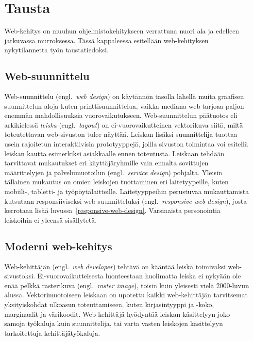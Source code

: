 \documentclass[finnish, 12pt, a4paper, elec, utf8, a-1b, online]{aaltothesis}
\begin{document}
\clearpage

\section{Tausta}

Web-kehitys on muuhun ohjelmistokehitykseen verrattuna nuori ala ja
edelleen jatkuvassa murroksessa. Tässä kappaleessa esitellään web-kehityksen
nykytilannetta työn taustatiedoksi.

\subsection{Web-suunnittelu}

Web-suunnittelu (engl.~\textit{web design}) on käytännön tasolla lähellä muita
graafisen suunnittelun aloja kuten printtisuunnittelua, vaikka mediana web
tarjoaa paljon enemmän mahdollisuuksia vuorovaikutukseen. Web-suunnittelun
päätuotos eli arkikielessä \textit{leiska} (engl.~\textit{layout}) on
ei-vuorovaikutteinen vektorikuva siitä, miltä toteutettavan web-sivuston tulee
näyttää. Leiskan lisäksi suunnittelija tuottaa usein rajoitetun interaktiivisia
prototyyppejä, joilla sivuston toimintaa voi esitellä leiskan kautta esimerkiksi
asiakkaalle ennen toteutusta. Leiskaan tehdään tarvittavat mukautukset eri
käyttäjäryhmille vain ennalta sovittujen määrittelyjen ja palvelumuotoilun
(engl.~\textit{service design}) pohjalta. Yleisin tällainen mukautus on omien
leiskojen tuottaminen eri laitetyypeille, kuten mobiili-, tabletti- ja
työpöytälaitteille. Laitetyyppeihin perustuvaa mukauttamista kutsutaan
responsiiviseksi web-suunnitteluksi (engl.~\textit{responsive web design}),
josta kerrotaan lisää luvussa~\ref{responsive-web-design}. Varsinaista
personointia leiskoihin ei yleensä sisällytetä.

\subsection{Moderni web-kehitys}

Web-kehittäjän (engl.~\textit{web developer}) tehtävä on kääntää leiska
toimivaksi web-sivustoksi. Ei-vuorovaikutteisesta luonteestaan huolimatta leiska
ei nykyään ole enää pelkkä rasterikuva (engl.~\textit{raster image}), toisin
kuin yleisesti vielä 2000-luvun alussa. Vektorimuotoiseen leiskaan on upotettu
kaikki web-kehittäjän tarvitsemat yksityiskohdat ulkoasun toteuttamiseen, kuten
kirjasintyyppi ja -koko, marginaalit ja värikoodit. Web-kehittäjä hyödyntää
leiskan käsittelyyn joko samoja työkaluja kuin suunnittelija, tai varta vasten
leiskojen käsittelyyn tarkoitettuja kehittäjätyökaluja.
\end{document}
